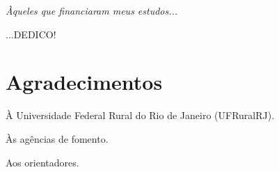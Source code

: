 \documentclass[tese]{UFRuralRJ}
\author{Rural}{Nome da Melhor Estudante da} %
\date{30}{Fevereiro}{2016} %
\begin{document}
\maketitle


\makeapprove


\clearpage\mbox{}\vfill\hspace{80mm}
\begin{minipage}{76mm}
  \begin{flushright}
    {\em
    Àqueles que financiaram meus estudos...
    \par
    ...DEDICO!
    }
  \end{flushright}
\end{minipage}


\chapter*{Agradecimentos}

À Universidade Federal Rural do Rio de Janeiro (UFRuralRJ).

Às agências de fomento.

Aos orientadores.
\end{document}

